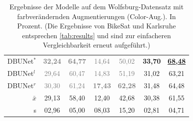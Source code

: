 \begin{table}[ht]
\begin{tabular}{l|cc|cc|cc}
        DBUNet$^*$ & \textcolor{gray}{\textbf{32,24}} & \textcolor{gray}{\textbf{64,77}} & \textcolor{gray}{14,64} & \textcolor{gray}{50,02} &  \textbf{33,70} & \underline{\textbf{68,48}} \\
        DBUNet$^l$ & \textcolor{gray}{29,64} & \textcolor{gray}{60,47} & \textcolor{gray}{14,83} & \textcolor{gray}{51,19} &  31,02 & 63,21 \\
        DBUNet$^r$ & \textcolor{gray}{30,30} & \textcolor{gray}{61,24} & \textcolor{gray}{\textbf{17,43}} & \textcolor{gray}{\textbf{62,28}} &  31,48 & 64,48 \\

		\bottomrule
		\multicolumn{1}{r|}{$\bar{x}$} & 29,13 & 58,40 & 12,40 & 42,68 & 30,38 & 61,55 \\
		\midrule
		\multicolumn{1}{r|}{s} & 02,96 & 05,00 & 08,03 & 15,20 & 02,81 & 04,71 \\
		
		
        
	\end{tabular}
	\caption{Ergebnisse der Modelle auf dem Wolfsburg-Datensatz mit farbverändernden Augmentierungen (Color-Aug.). In Prozent.
	(Die Ergebnisse von BikeSat und Karlsruhe entsprechen \autoref{tab:results} und sind zur einfacheren Vergleichbarkeit erneut aufgeführt.)}
	\label{tab:results-wolfsburg}
\end{table}

